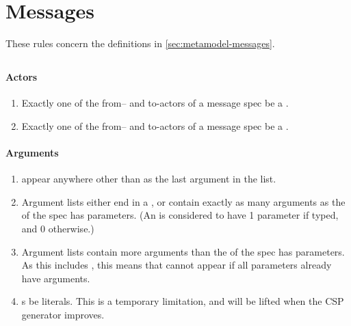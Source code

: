 \section{Messages}\label{sec:wf-messages}

These rules concern the definitions in \cref{sec:metamodel-messages}.

\subsection{\mmessagespec}

\paragraph{Actors}

\begin{enumerate}
\item
	Exactly one of the from-- and to-actors of a message spec \rfcmust{} 
	be a \mtarget.
\item
	Exactly one of the from-- and to-actors of a message spec \rfcmust{} 
	be a \mworld.
\end{enumerate}

\paragraph{Arguments}

\begin{enumerate}
\item
	\mrestargument{} \rfcmustnot{} appear anywhere other than as the last
	argument in the list.
\item
	Argument lists \rfcmust{} either end in a \mrestargument, or
	contain exactly as many arguments as the \mmessagetopic{} of the spec
	has parameters.  (An \meventtopic{} is considered to have 1 parameter
	if typed, and 0 otherwise.)
\item
	Argument lists \rfcmustnot{} contain more
	arguments than the \mmessagetopic{} of the spec has parameters.
	As this includes \mrestargument, this means that \mrestargument{} cannot
	appear if all parameters already have arguments.
\item
	\mexpressionargument s \rfcshould{} be literals.  This is a temporary
	limitation, and will be lifted when the CSP generator improves.
\end{enumerate}

